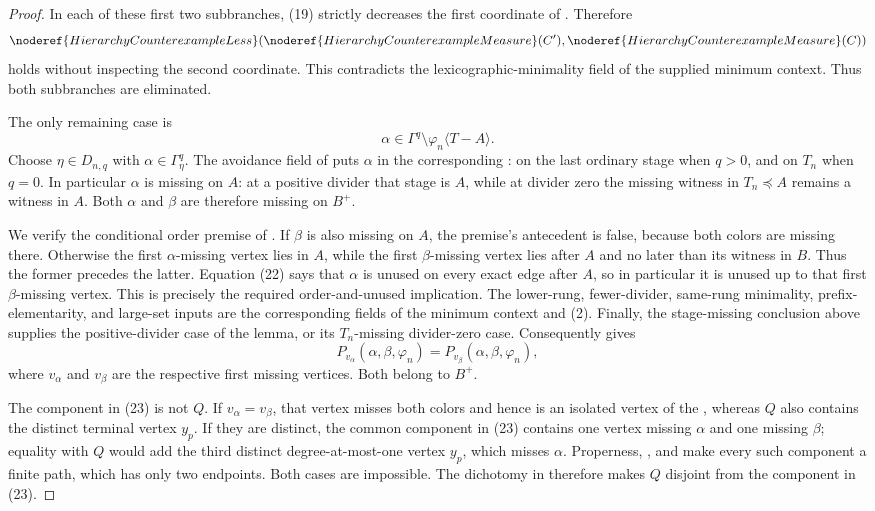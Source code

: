 \begin{proof}
In each of these first two subbranches, (19) strictly decreases the first
coordinate of
.  Therefore
\[
 \noderef{HierarchyCounterexampleLess}
   (\noderef{HierarchyCounterexampleMeasure}(C'),
    \noderef{HierarchyCounterexampleMeasure}(C))
\]
holds without inspecting the second coordinate.  This contradicts the
lexicographic-minimality field of the supplied minimum context.  Thus both
subbranches are eliminated.

The only remaining case is
\[
          \alpha\in\Gamma^q
             \setminus\varphi_n\langle T-A\rangle.             \tag{22}
\]
Choose \(\eta\in D_{n,q}\) with
\(\alpha\in\Gamma^q_\eta\).  The avoidance field of
 puts \(\alpha\) in the corresponding
: on the last ordinary stage when
\(q>0\), and on \(T_n\) when \(q=0\).  In particular \(\alpha\) is missing
on \(A\): at a positive divider that stage is \(A\), while at divider zero
the missing witness in \(T_n\preccurlyeq A\) remains a witness in \(A\).
Both \(\alpha\) and \(\beta\) are therefore missing on \(B^+\).

We verify the conditional order premise of .  If
\(\beta\) is also missing on \(A\), the premise's antecedent is false,
because both colors are missing there.  Otherwise the first
\(\alpha\)-missing vertex lies in \(A\), while the first
\(\beta\)-missing vertex lies after \(A\) and no later than its witness in
\(B\).  Thus the former precedes the latter.  Equation (22) says that
\(\alpha\) is unused on every exact edge after \(A\), so in particular it
is unused up to that first \(\beta\)-missing vertex.  This is precisely the
required order-and-unused implication.  The lower-rung, fewer-divider,
same-rung minimality, prefix-elementarity, and large-set inputs are the
corresponding fields of the minimum context and (2).  Finally, the
stage-missing conclusion above supplies the positive-divider case of the
lemma, or its \(T_n\)-missing divider-zero case.  Consequently
 gives
\[
 P_{v_\alpha}(\alpha,\beta,\varphi_n)
   =P_{v_\beta}(\alpha,\beta,\varphi_n),                     \tag{23}
\]
where \(v_\alpha\) and \(v_\beta\) are the respective first missing
vertices.  Both belong to \(B^+\).

The component in (23) is not \(Q\).  If
\(v_\alpha=v_\beta\), that vertex misses both colors and hence is an
isolated vertex of the , whereas \(Q\) also
contains the distinct terminal vertex \(y_p\).  If they are distinct,
the common component in (23) contains one vertex missing \(\alpha\) and
one missing \(\beta\); equality with \(Q\) would add the third distinct
degree-at-most-one vertex \(y_p\), which misses \(\alpha\).  Properness,
, and
 make every such component a
finite path, which has only two endpoints.  Both cases are impossible.
The dichotomy in  therefore makes
\(Q\) disjoint from the component in (23).


\end{proof}
